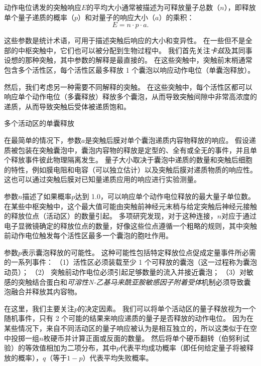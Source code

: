 \begin{proposition}[突触强度取决于递质释放的概率和其他量子参数] \label{box:15_1}
	
	\quad \quad 动作电位诱发的突触响应$E$的平均大小通常被描述为可释放量子总数（$n$），即释放单个量子递质的概率（$p$）和对量子的响应大小（$a$）的乘积：
	\begin{equation}\label{eq:15_quantum_response}
		E = n \cdot p \cdot a.
	\end{equation}
	
	\quad \quad 这些参数是统计术语，可用于描述突触后响应的大小和变异性。
	在一些但不是全部的中枢突触中，它们也可以被分配到生物过程中。
	我们首先关注\textit{卡兹}及其同事设想的那种突触，其中参数的解释是最直接的。
	在这些突触中，突触前末梢通常包含多个活性区，每个活性区最多释放 1 个囊泡以响应动作电位（单囊泡释放）。
	
	\quad \quad 然后，我们考虑另一种需要不同解释的突触。
	在这些突触中，每个活性区都可以响应单个动作电位（多囊释放）释放多个囊泡，从而导致突触间隙中非常高浓度的递质，从而导致突触后受体被递质饱和。
	
	\quad \quad 多个活动区的单囊释放
	
	\quad \quad 在最简单的情况下，参数$a$是突触后膜对单个囊泡递质内容物释放的响应。
	假设递质被包装在突触囊泡中，囊泡内容物的释放是定型的、全有或全无的事件，并且单个释放事件彼此物理隔离发生。
	量子大小取决于囊泡中递质的数量和突触后细胞的特性，例如膜电阻和电容（可以独立估计）以及突触后膜对递质物质的响应性。
	这也可以通过突触后膜对已知量递质应用的响应进行实验测量。
	
	\quad \quad 参数$ n $描述了如果概率$ p $达到 1.0，可以响应单个动作电位释放的最大量子单位数。
	在某些中枢突触中，这个最大值可能由突触前神经元末梢与给定突触后神经元接触的释放位点（活动区）的数量引起。
	多项研究发现，对于这种连接，$ n $对应于通过电子显微镜确定的释放位点的数量，好像这些位点遵循一个粗略的规则，其中突触前动作电位触发每个活性区最多一个囊泡的胞吐作用。
	
	\quad \quad 参数$ p $表示囊泡释放的可能性。
	这种可能性包括特定释放位点促成定量事件所必需的一系列事件：
	（1）活性区必须装载至少 1 个可释放的囊泡（这一过程称为囊泡动员）；
	（2） 突触前动作电位必须引起足够数量的流入并接近囊泡；
	（3）对敏感的突触结合蛋白和\textit{可溶性N-乙基马来酰亚胺敏感因子附着受体}机制必须导致囊泡融合并释放其内容物。
	
	\quad \quad 在这里，我们主要关注$ p $的决定因素。
	我们可以将单个活动区的量子释放视为一个随机事件，只有 2 个可能的结果来响应递质的量子是否释放的动作电位。
	因为在某些情况下，来自不同活动区的量子响应被认为是相互独立的，所以这类似于在空中投掷一组$n$枚硬币并计算正面或反面的数量。
	然后将单个硬币翻转（伯努利试验）的等效值相加为二项分布，其中$ p $代表平均成功概率（即任何给定量子将被释放的概率），$ q $（等于$ 1-p $）代表平均失败概率。
	

\end{proposition}
